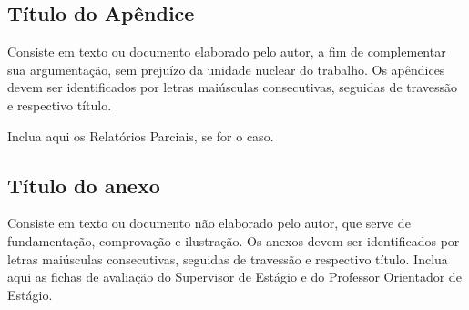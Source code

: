 \documentclass[
	12pt,				%
	openright,			%
	oneside,			%
	a4paper,			%
	english,			%
	french,				%
	spanish,			%
	brazil				%
	]{abntex2}
\begin{document}
\begin{apendicesenv}


\chapter{Título do Apêndice}

Consiste em texto ou documento elaborado pelo autor, a fim de complementar sua argumentação, sem prejuízo da unidade nuclear do trabalho. Os apêndices devem ser identificados por letras maiúsculas consecutivas, seguidas de travessão e respectivo título.

Inclua aqui os Relatórios Parciais, se for o caso.

\end{apendicesenv}



\begin{anexosenv}


\chapter{Título do anexo}
Consiste em texto ou documento não elaborado pelo autor, que serve de fundamentação, comprovação e ilustração. Os anexos devem ser identificados por letras maiúsculas consecutivas, seguidas de travessão e respectivo título. Inclua aqui as fichas de avaliação do Supervisor de Estágio e do Professor Orientador de Estágio.

\end{anexosenv}

\printindex
\end{document}
